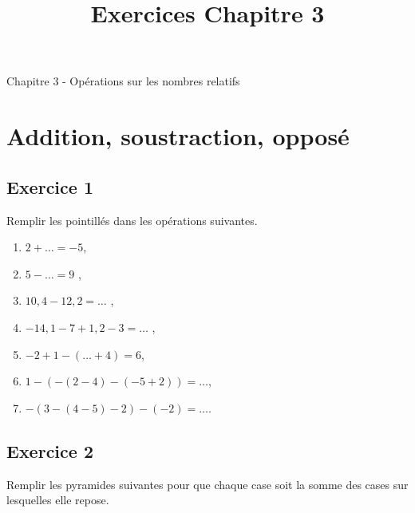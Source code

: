 \documentclass[12 pt]{extarticle}
\title{Exercices Chapitre 3}
\date{}
\theoremstyle{plain}
\begin{document}
\begin{center}{\Large Chapitre 3 - Opérations sur les nombres relatifs}\\
 \end{center} 
 
 \section{Addition, soustraction, opposé}
\subsection*{Exercice 1}

Remplir les pointillés dans les opérations suivantes. \begin{enumerate}
\item $ 2+ \ldots = -5 $,
\item $ 5 - \ldots = 9$ ,
\item $10,4 - 12, 2 = \ldots$ ,
\item $ - 14,1 - 7 + 1,2 - 3 = \ldots$ ,
\item $- 2 + 1 - (\ldots + 4) = 6$,
\item $ 1 - (  - (2 - 4) - ( -5 + 2) ) = \ldots$,
\item $ - (3 - (4 - 5) - 2) - (-2) = \ldots $. 
\end{enumerate}

\subsection*{Exercice 2}
Remplir les pyramides suivantes pour que chaque case soit la somme des cases sur lesquelles elle repose. 
\end{document}
